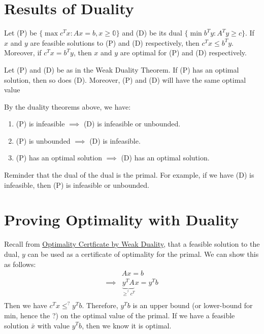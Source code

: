 \documentclass[a4paper]{report}
\begin{document}
	\section{Results of Duality}
	\begin{theorem}
		Let (P) be $\{\max c^{T}x : Ax = b, x\geq \mathbb{0}\}$ and (D) be its dual $\{
		\min b^{T} y : A^{T} y \geq c\}$. If $x$ and $y$ are feasible solutions to (P)
		and (D) respectively, then $c^{T} x \leq b^{T} y$. Moreover, if $c^{T} x = b^{T}
		y$, then $x$ and $y$ are optimal for (P) and (D) respectively.
	\end{theorem}
	\begin{theorem}
		Let (P) and (D) be as in the Weak Duality Theorem. If (P) has an optimal
		solution, then so does (D). Moreover, (P) and (D) will have the same optimal
		value
	\end{theorem}
	\begin{corollary}
		By the duality theorems above, we have:
		\begin{enumerate}
			\item (P) is infeasible $\implies$ (D) is infeasible or unbounded.

			\item (P) is unbounded $\implies$ (D) is infeasible.

			\item (P) has an optimal solution $\implies$ (D) has an optimal solution.
		\end{enumerate}
		Reminder that the dual of the dual is the primal. For example, if we have (D)
		is infeasible, then (P) is infeasible or unbounded.
	\end{corollary}

	\section{Proving Optimality with Duality}
	Recall from \hyperref[optimality:ii]{Optimality Certficate by Weak Duality},
	that a feasible solution to the dual, $y$ can be used as a certificate of optimality
	for the primal. We can show this as follows:
	\begin{align*}
		         & Ax = b                                    \\
		\implies & \underbrace{y^TA}_{\geq^? c^T}x = y^{T} b \\
	\end{align*}
	Then we have $c^{T}x \leq^{?} y^{T} b$. Therefore, $y^{T} b$ is an upper bound
	(or lower-bound for min, hence the ?) on the optimal value of the primal. If we
	have a feasible solution $\bar x$ with value $y^{T} b$, then we know it is
	optimal.
\end{document}
